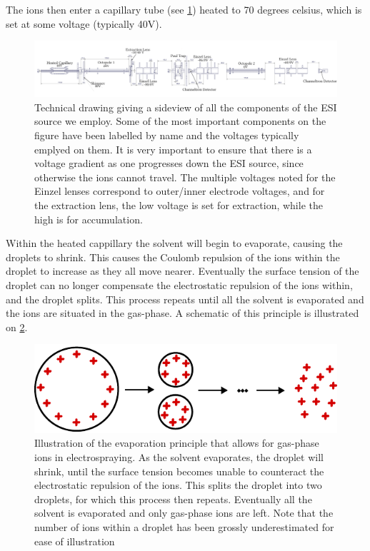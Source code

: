 The ions then enter a capillary tube (see \cref{fig:esiDrawing}) heated to 70 degrees celsius, which is set at some voltage (typically 40V).
\begin{figure}
    \centering
    \includegraphics[width = 1.1\textwidth]{main/electrospray_elements.pdf}
    \caption{Technical drawing giving a sideview of all the components of the ESI source we employ. Some of the most important components on the figure have been labelled by name and the voltages typically emplyed on them.
    It is very important to ensure that there is a voltage gradient as one progresses down the ESI source, since otherwise the ions cannot travel. The multiple voltages noted for the Einzel lenses correspond to outer/inner electrode voltages, and for the extraction lens, the low voltage is set for extraction, while the high is for accumulation.}
    \label{fig:esiDrawing}
\end{figure}
Within the heated cappillary the solvent will begin to evaporate, causing the droplets to shrink. This causes the Coulomb repulsion of the ions within the droplet to increase as they all move nearer.
Eventually the surface tension of the droplet can no longer compensate the electrostatic repulsion of the ions within, and the droplet splits. This process repeats until all the solvent is evaporated and the ions are situated in the gas-phase. A schematic of this principle is illustrated on \cref{fig:evaporation}.
\begin{figure}
    \centering
    \includegraphics{main/evaporation.pdf}
    \caption{Illustration of the evaporation principle that allows for gas-phase ions in electrospraying. As the solvent evaporates, the droplet will shrink, until the surface tension becomes unable to counteract the electrostatic repulsion of the ions. This splits the droplet into two droplets, for which this process then repeats. Eventually all the solvent is evaporated and only gas-phase ions are left. Note that the number of ions within a droplet has been grossly underestimated for ease of illustration}
    \label{fig:evaporation}
\end{figure}

